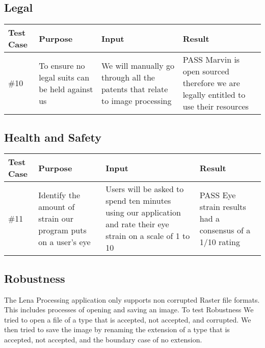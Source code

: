 \documentclass[12pt, titlepage]{article}
\begin{document}
\subsection{Legal}
\begin{table}[!hb]
\scriptsize
\begin{tabu} to 1.1\textwidth { | X[.3] | X[.7] | X[.7] | X[.7] |}
\hline
	      		Test Case & Purpose & Input & Result \\
\hline
\#10
& To ensure no legal suits can be held against us
& We will manually go through all the patents that relate to image processing
& PASS Marvin is open sourced therefore we are legally entitled to use their resources\\
\hline
	\end{tabu}
	\end{table}

\subsection{Health and Safety}
\begin{table}[!hb]
\scriptsize
\begin{tabu} to 1.1\textwidth { | X[.3] | X[.7] | X[.7] | X[.7] |}
\hline
	      		Test Case & Purpose & Input & Result \\
\hline
\#11
& Identify the amount of strain our program puts on a user’s eye
& Users will be asked to spend ten minutes using our application and rate their eye strain on a scale of 1 to 10
& PASS Eye strain results had a consensus of a 1/10 rating\\
\hline
	\end{tabu}
	\end{table}

\subsection{Robustness}
The Lena Processing application only supports non corrupted Raster file formats. This includes processes of opening and saving an image. To test Robustness We tried to open a file of a type that is accepted, not accepted, and corrupted. We then tried to save the image by renaming the extension of a type that is accepted, not accepted, and the boundary case of no extension.
\end{document}
